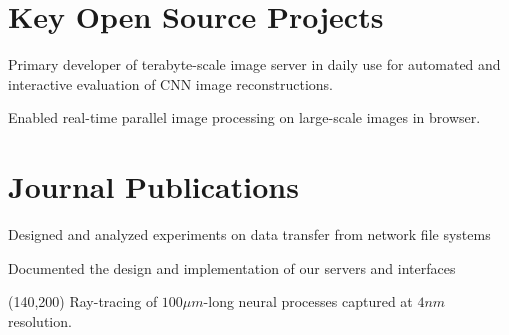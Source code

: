 \documentclass[]{deedy-resume-openfont}
\begin{document}
\begin{minipage}[t]{0.66\textwidth}
\section{Key Open Source Projects}
\begin{tightemize}
\item Primary developer of terabyte-scale image server in daily use for automated and interactive evaluation of CNN image reconstructions.
\end{tightemize}
\sectionsep
{}
\begin{tightemize}
\item Enabled real-time parallel image processing on large-scale images in browser.
\end{tightemize}
\sectionsep


\section{Journal Publications}
\begin{tightemize}
\item Designed and analyzed experiments on data transfer from network file systems
\item Documented the design and implementation of our servers and interfaces
\end{tightemize}
\sectionsep
\end{minipage} 



\begin{textblock}{50}(140,200)
\color{date}\fontsize{8pt}{10pt}\selectfont 
Ray-tracing of $100\mu m$-long neural processes captured at $4nm$ resolution.
\end{textblock}
\end{document}
